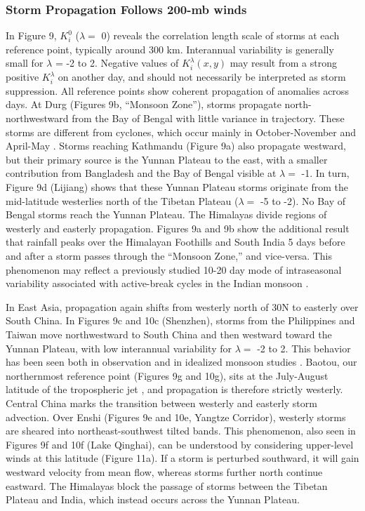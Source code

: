 \documentclass[12pt]{article}
\begin{document}
\subsubsection{Storm Propagation Follows 200-mb winds}	
		 	 		
	 In Figure 9, $K_i^0$ ($\lambda =$ 0) reveals the correlation length scale of storms at each reference point, typically around 300 km. Interannual variability is generally small for $\lambda$ = -2 to 2. Negative values of $K_i^\lambda(x,y)$ may result from a strong positive $K_i^{\lambda}$  on another day, and should not necessarily be interpreted as storm suppression. All reference points show coherent propagation of anomalies across days. At Durg (Figures 9b, ``Monsoon Zone''), storms propagate north-northwestward from the Bay of Bengal with little variance in trajectory. These storms are different from cyclones, which occur mainly in October-November and April-May \citep{Li2013}. Storms reaching Kathmandu (Figure 9a) also propagate westward, but their primary source is the Yunnan Plateau to the east, with a smaller contribution from Bangladesh and the Bay of Bengal visible at $\lambda =$ -1. In turn, Figure 9d (Lijiang) shows that these Yunnan Plateau storms originate from the mid-latitude westerlies north of the Tibetan Plateau ($\lambda =$ -5 to -2). No Bay of Bengal storms reach the Yunnan Plateau. The Himalayas divide regions of westerly and easterly propagation. Figures 9a and 9b show the additional result that rainfall peaks over the Himalayan Foothills and South India 5 days before and after a storm passes through the ``Monsoon Zone,'' and vice-versa. This phenomenon may reflect a previously studied 10-20 day mode of intraseasonal variability associated with active-break cycles in the Indian monsoon \citep{Chen1993,Annamalai2001,Han2006}.
	 
	 In East Asia, propagation again shifts from westerly north of 30\textdegree N to easterly over South China. In Figures 9c and 10c (Shenzhen), storms from the Philippines and Taiwan move northwestward to South China and then westward toward the Yunnan Plateau, with low interannual variability for $\lambda =$ -2 to 2. This behavior has been seen both in observation \citep{Chen1999} and in idealized monsoon studies \citep{Prive2007a}. Baotou, our northernmost reference point (Figures 9g and 10g), sits at the July-August latitude of the tropospheric jet \citep{Schiemann2009}, and propagation is therefore strictly westerly. Central China marks the transition between westerly and easterly storm advection. Over Enshi (Figures 9e and 10e, Yangtze Corridor), westerly storms are sheared into northeast-southwest tilted bands. This phenomenon, also seen in Figures 9f and 10f (Lake Qinghai), can be understood by considering upper-level winds at this latitude (Figure 11a). If a storm is perturbed southward, it will gain westward velocity from mean flow, whereas storms further north continue eastward. The Himalayas block the passage of storms between the Tibetan Plateau and India, which instead occurs across the Yunnan Plateau.
	 
\end{document}
